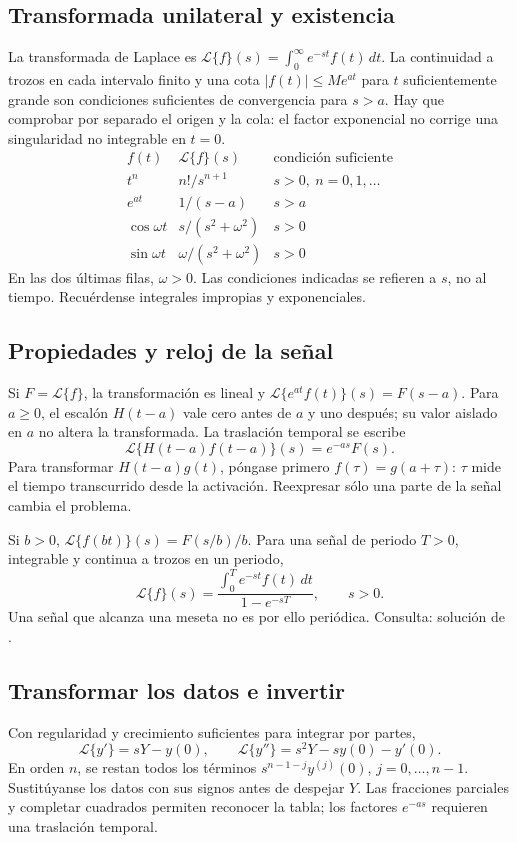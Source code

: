%
\subsection*{Transformada unilateral y existencia}
\label{CH06-B01}
La transformada de Laplace es
$\mathcal L\{f\}(s)=\int_0^\infty e^{-st}f(t)\,dt$.
La continuidad a trozos en cada intervalo finito y una cota
$|f(t)|\le M e^{at}$ para $t$ suficientemente grande son condiciones
suficientes de convergencia para $s>a$. Hay que comprobar por separado
el origen y la cola: el factor exponencial no corrige una singularidad
no integrable en $t=0$.
\[
\begin{array}{c|c|c}
 f(t)&\mathcal L\{f\}(s)&\text{condición suficiente}\\\hline
 t^n&n!/s^{n+1}&s>0,\ n=0,1,\ldots\\
 e^{at}&1/(s-a)&s>a\\
 \cos\omega t&s/(s^2+\omega^2)&s>0\\
 \sin\omega t&\omega/(s^2+\omega^2)&s>0
\end{array}
\]
En las dos últimas filas, $\omega>0$. Las condiciones indicadas se
refieren a $s$, no al tiempo. Recuérdense integrales impropias y
exponenciales.

%
\subsection*{Propiedades y reloj de la señal}
\label{CH06-B02}
Si $F=\mathcal L\{f\}$, la transformación es lineal y
$\mathcal L\{e^{at}f(t)\}(s)=F(s-a)$. Para $a\ge0$, el escalón
$H(t-a)$ vale cero antes de $a$ y uno después; su valor aislado en $a$
no altera la transformada. La traslación temporal se escribe
\[
 \mathcal L\{H(t-a)f(t-a)\}(s)=e^{-as}F(s).
\]
Para transformar $H(t-a)g(t)$, póngase primero
$f(\tau)=g(a+\tau)$: $\tau$ mide el tiempo transcurrido desde la
activación. Reexpresar sólo una parte de la señal cambia el problema.

Si $b>0$, $\mathcal L\{f(bt)\}(s)=F(s/b)/b$. Para una señal de periodo
$T>0$, integrable y continua a trozos en un periodo,
\[
 \mathcal L\{f\}(s)=\frac{\int_0^T e^{-st}f(t)\,dt}{1-e^{-sT}},
 \qquad s>0.
\]
Una señal que alcanza una meseta no es por ello periódica.
Consulta: solución de .

%
\subsection*{Transformar los datos e invertir}
\label{CH06-B03}
Con regularidad y crecimiento suficientes para integrar por partes,
\[
 \mathcal L\{y'\}=sY-y(0),\qquad
 \mathcal L\{y''\}=s^2Y-sy(0)-y'(0).
\]
En orden $n$, se restan todos los términos
$s^{n-1-j}y^{(j)}(0)$, $j=0,\ldots,n-1$. Sustitúyanse los datos con
sus signos antes de despejar $Y$. Las fracciones parciales y completar
cuadrados permiten reconocer la tabla; los factores $e^{-as}$ requieren
una traslación temporal.


